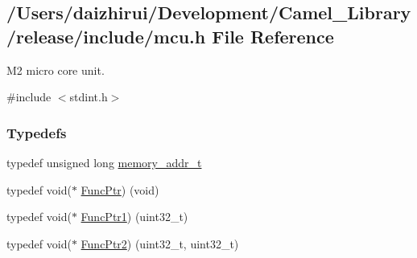 \hypertarget{a00020}{}\subsection{/\+Users/daizhirui/\+Development/\+Camel\+\_\+\+Library/release/include/mcu.h File Reference}
\label{a00020}


M2 micro core unit.  


{\ttfamily \#include $<$stdint.\+h$>$}\newline
\subsubsection*{Typedefs}
\begin{DoxyCompactItemize}
\item 
typedef unsigned long \mbox{\hyperlink{a00020_a06da901348542a481c297d9b700e2001}{memory\+\_\+addr\+\_\+t}}
\item 
typedef void($\ast$ \mbox{\hyperlink{a00020_a3d987633d7a3ca10c14905a807b62eb1}{Func\+Ptr}}) (void)
\item 
typedef void($\ast$ \mbox{\hyperlink{a00020_a0891965816a5b721b07f7bebefaf7430}{Func\+Ptr1}}) (uint32\+\_\+t)
\item 
typedef void($\ast$ \mbox{\hyperlink{a00020_a331a88eeefe11112bb8fe1b43dd777b8}{Func\+Ptr2}}) (uint32\+\_\+t, uint32\+\_\+t)
\end{DoxyCompactItemize}

